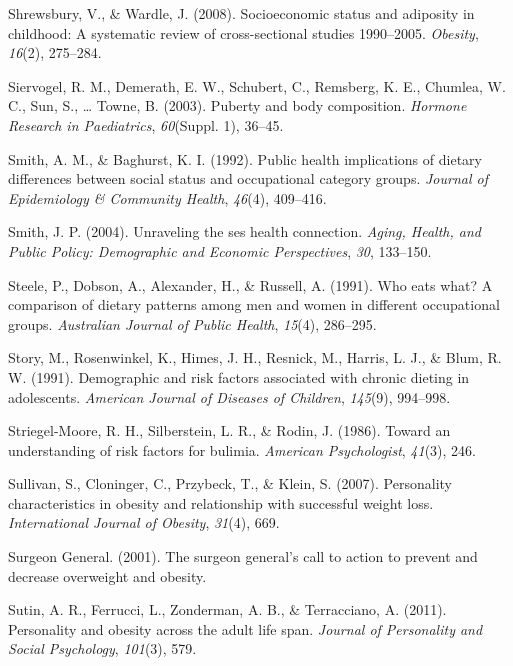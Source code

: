 \documentclass[man]{apa6}
\begin{document}
\leavevmode\hypertarget{ref-shrewsbury2008socioeconomic}{}%
Shrewsbury, V., \& Wardle, J. (2008). Socioeconomic status and adiposity in childhood: A systematic review of cross-sectional studies 1990--2005. \emph{Obesity}, \emph{16}(2), 275--284.

\leavevmode\hypertarget{ref-siervogel2003puberty}{}%
Siervogel, R. M., Demerath, E. W., Schubert, C., Remsberg, K. E., Chumlea, W. C., Sun, S., \ldots{} Towne, B. (2003). Puberty and body composition. \emph{Hormone Research in Paediatrics}, \emph{60}(Suppl. 1), 36--45.

\leavevmode\hypertarget{ref-smith1992public}{}%
Smith, A. M., \& Baghurst, K. I. (1992). Public health implications of dietary differences between social status and occupational category groups. \emph{Journal of Epidemiology \& Community Health}, \emph{46}(4), 409--416.

\leavevmode\hypertarget{ref-smiith2004}{}%
Smith, J. P. (2004). Unraveling the ses health connection. \emph{Aging, Health, and Public Policy: Demographic and Economic Perspectives}, \emph{30}, 133--150.

\leavevmode\hypertarget{ref-steele1991eats}{}%
Steele, P., Dobson, A., Alexander, H., \& Russell, A. (1991). Who eats what? A comparison of dietary patterns among men and women in different occupational groups. \emph{Australian Journal of Public Health}, \emph{15}(4), 286--295.

\leavevmode\hypertarget{ref-story1991demographic}{}%
Story, M., Rosenwinkel, K., Himes, J. H., Resnick, M., Harris, L. J., \& Blum, R. W. (1991). Demographic and risk factors associated with chronic dieting in adolescents. \emph{American Journal of Diseases of Children}, \emph{145}(9), 994--998.

\leavevmode\hypertarget{ref-striegel1986toward}{}%
Striegel-Moore, R. H., Silberstein, L. R., \& Rodin, J. (1986). Toward an understanding of risk factors for bulimia. \emph{American Psychologist}, \emph{41}(3), 246.

\leavevmode\hypertarget{ref-sullivan2007personality}{}%
Sullivan, S., Cloninger, C., Przybeck, T., \& Klein, S. (2007). Personality characteristics in obesity and relationship with successful weight loss. \emph{International Journal of Obesity}, \emph{31}(4), 669.

\leavevmode\hypertarget{ref-office2001surgeon}{}%
Surgeon General. (2001). The surgeon general's call to action to prevent and decrease overweight and obesity.

\leavevmode\hypertarget{ref-sutin2011personality}{}%
Sutin, A. R., Ferrucci, L., Zonderman, A. B., \& Terracciano, A. (2011). Personality and obesity across the adult life span. \emph{Journal of Personality and Social Psychology}, \emph{101}(3), 579.
\end{document}
